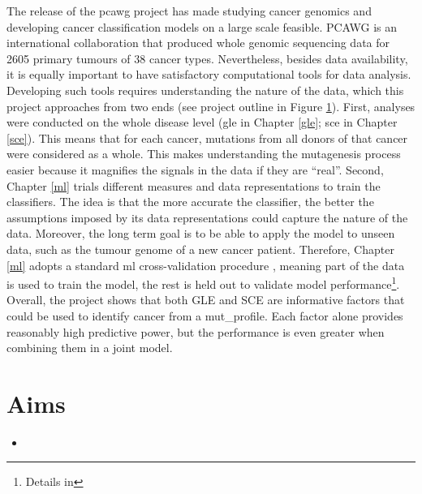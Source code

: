 The release of the \gls{pcawg} project \citep{Campbell2020} has made studying cancer genomics and developing cancer classification models on a large scale feasible. PCAWG is an international collaboration that produced whole genomic sequencing data for 2605 primary tumours of 38 cancer types. Nevertheless, besides data availability, it is equally important to have satisfactory computational tools for data analysis. Developing such tools requires understanding the nature of the data, which this project approaches from two ends (see project outline in Figure \ref{}). First, analyses were conducted on the whole disease level (\gls{gle} in Chapter \ref{gle}; \gls{sce} in Chapter \ref{sce}). This means that for each cancer, mutations from all donors of that cancer were considered as a whole. This makes understanding the mutagenesis process easier because it magnifies the signals in the data if they are ``real''. Second, Chapter \ref{ml} trials different measures and data representations to train the classifiers. The idea is that the more accurate the classifier, the better the assumptions imposed by its data representations could capture the nature of the data. Moreover, the long term goal is to be able to apply the model to unseen data, such as the tumour genome of a new cancer patient. Therefore, Chapter \ref{ml} adopts a standard \gls{ml} cross-validation procedure \citep{Zengyou2015DataApplications}, meaning part of the data is used to train the model, the rest is held out to validate model performance\footnote{Details in }. Overall, the project shows that both GLE and SCE are informative factors that could be used to identify cancer from a \gls{mut_profile}. Each factor alone provides reasonably high predictive power, but the performance is even greater when combining them in a joint model.



\section{Aims}

\begin{itemize}
    \item 
\end{itemize}